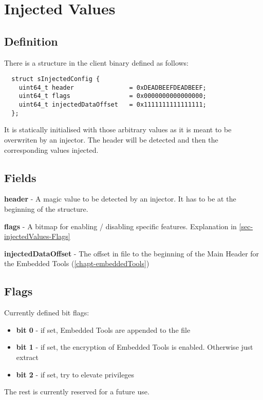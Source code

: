 \chapter{Injected Values}
\label{chapt-injectedValues}

\section{Definition}

There is a structure in the client binary defined as follows:

\begin{lstlisting}
  struct sInjectedConfig {
    uint64_t header               = 0xDEADBEEFDEADBEEF;
    uint64_t flags                = 0x0000000000000000;
    uint64_t injectedDataOffset   = 0x1111111111111111;
  };
\end{lstlisting}

It is statically initialised with those arbitrary values as it is meant to be overwriten by an injector. The header will be detected and then the corresponding values injected.

\section{Fields}

\textbf{header} - A magic value to be detected by an injector. It has to be at the beginning of the structure.

\textbf{flags} - A bitmap for enabling / disabling specific features. Explanation in \autoref{sec-injectedValues-Flags}

\textbf{injectedDataOffset} - The offset in file to the beginning of the Main Header for the Embedded Tools (\autoref{chapt-embeddedTools})

\section{Flags}
\label{sec-injectedValues-Flags}
Currently defined bit flags:
\begin{itemize}
  \item \textbf{bit 0} - if set, Embedded Tools are appended to the file
  \item \textbf{bit 1} - if set, the encryption of Embedded Tools is enabled. Otherwise just extract
  \item \textbf{bit 2} - if set, try to elevate privileges
\end{itemize}

The rest is currently reserved for a future use.